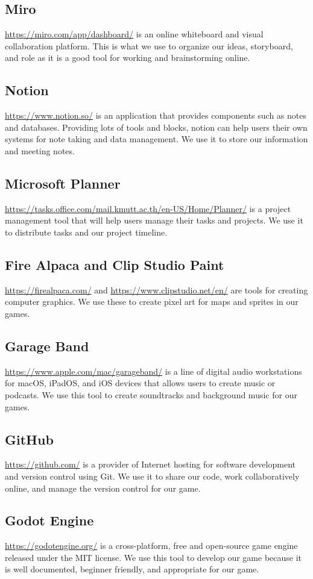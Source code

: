 \medskip
\subsection{Miro}
\url{https://miro.com/app/dashboard/} is an online whiteboard and visual collaboration platform. This is what we use to organize our ideas, storyboard, and role as it is a good tool for working and brainstorming online. 
\subsection{Notion}
\url{https://www.notion.so/} is an application that provides components such as notes and databases. Providing lots of tools and blocks, notion can help users their own systems for note taking and data management. We use it to store our information and meeting notes. 
\subsection{Microsoft Planner}
\url{https://tasks.office.com/mail.kmutt.ac.th/en-US/Home/Planner/} is a project management tool that will help users manage their tasks and projects. We use it to distribute tasks and our project timeline. 
\subsection{Fire Alpaca and Clip Studio Paint}
\url{https://firealpaca.com/} and \url{https://www.clipstudio.net/en/} are tools for creating computer graphics. We use these to create pixel art for maps and sprites in our games.
\subsection{Garage Band}
\url{https://www.apple.com/mac/garageband/} is a line of digital audio workstations for macOS, iPadOS, and iOS devices that allows users to create music or podcasts. We use this tool to create soundtracks and background music for our games.
\subsection{GitHub}
\url{https://github.com/} is a provider of Internet hosting for software development and version control using Git. We use it to share our code, work collaboratively online, and manage the version control for our game.
\subsection{Godot Engine}
\url{https://godotengine.org/} is a cross-platform, free and open-source game engine released under the MIT license. We use this tool to develop our game because it is well documented, beginner friendly, and appropriate for our game.